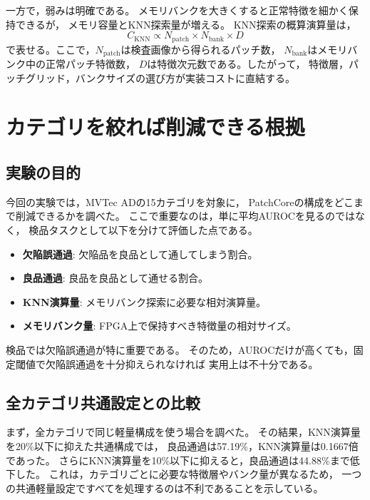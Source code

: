 \documentclass[uplatex,dvipdfmx,a4paper,11pt]{jsarticle}
\begin{document}
一方で，弱みは明確である。
メモリバンクを大きくすると正常特徴を細かく保持できるが，
メモリ容量とKNN探索量が増える。
KNN探索の概算演算量は，
\[
  C_{\mathrm{KNN}} \propto N_{\mathrm{patch}} \times N_{\mathrm{bank}} \times D
\]
で表せる。ここで，$N_{\mathrm{patch}}$は検査画像から得られるパッチ数，
$N_{\mathrm{bank}}$はメモリバンク中の正常パッチ特徴数，
$D$は特徴次元数である。したがって，
特徴層，パッチグリッド，バンクサイズの選び方が実装コストに直結する。

\section{カテゴリを絞れば削減できる根拠}

\subsection{実験の目的}

今回の実験では，MVTec ADの15カテゴリを対象に，
PatchCoreの構成をどこまで削減できるかを調べた。
ここで重要なのは，単に平均AUROCを見るのではなく，
検品タスクとして以下を分けて評価した点である。

\begin{itemize}
  \item \textbf{欠陥誤通過}: 欠陥品を良品として通してしまう割合。
  \item \textbf{良品通過}: 良品を良品として通せる割合。
  \item \textbf{KNN演算量}: メモリバンク探索に必要な相対演算量。
  \item \textbf{メモリバンク量}: FPGA上で保持すべき特徴量の相対サイズ。
\end{itemize}

検品では欠陥誤通過が特に重要である。
そのため，AUROCだけが高くても，固定閾値で欠陥誤通過を十分抑えられなければ
実用上は不十分である。

\subsection{全カテゴリ共通設定との比較}

まず，全カテゴリで同じ軽量構成を使う場合を調べた。
その結果，KNN演算量を20\%以下に抑えた共通構成では，
良品通過は57.19\%，KNN演算量は0.1667倍であった。
さらにKNN演算量を10\%以下に抑えると，良品通過は44.88\%まで低下した。
これは，カテゴリごとに必要な特徴層やバンク量が異なるため，
一つの共通軽量設定ですべてを処理するのは不利であることを示している。
\end{document}
